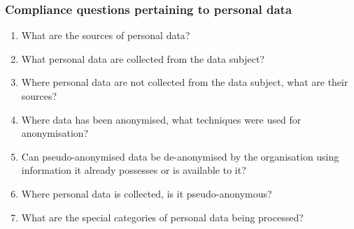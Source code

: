 \subsubsection{Compliance questions pertaining to personal data}\label{sec:info:CQ:4}
\begin{enumerate}[label={\textit{CMQ.\theenumi}},resume]
    \item What are the sources of personal data?
    \item What personal data are collected from the data subject?
    \item Where personal data are not collected from the data subject, what are their sources?
    \item Where data has been anonymised, what techniques were used for anonymisation?
    \item Can pseudo-anonymised data be de-anonymised by the organisation using information it already possesses or is available to it?
    \item Where personal data is collected, is it pseudo-anonymous?
    \item What are the special categories of personal data being processed?
\end{enumerate}

